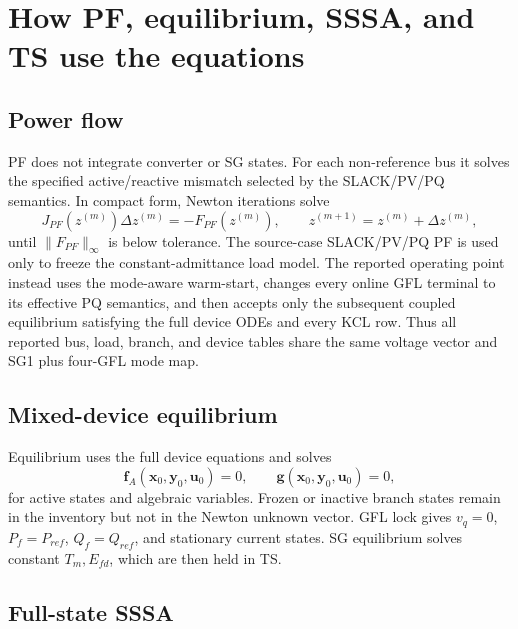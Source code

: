 \documentclass[12pt,a4paper]{article}
\newcommand{\vect}[1]{\boldsymbol{#1}}
\begin{document}
\section{How PF, equilibrium, SSSA, and TS use the equations}

\subsection{Power flow}

PF does not integrate converter or SG states.  For each non-reference bus it
solves the specified active/reactive mismatch selected by the SLACK/PV/PQ
semantics.  In compact form, Newton iterations solve
\[
J_{PF}(z^{(m)})\Delta z^{(m)}=-F_{PF}(z^{(m)}),\qquad
z^{(m+1)}=z^{(m)}+\Delta z^{(m)},
\]
until \(\|F_{PF}\|_\infty\) is below tolerance.  The source-case SLACK/PV/PQ PF
is used only to freeze the constant-admittance load model.  The reported
operating point instead uses the mode-aware warm-start, changes every online
GFL terminal to its effective PQ semantics, and then accepts only the
subsequent coupled equilibrium satisfying the full device ODEs and every KCL
row.  Thus all reported bus, load, branch, and device tables share the same
voltage vector and SG1 plus four-GFL mode map.

\subsection{Mixed-device equilibrium}

Equilibrium uses the full device equations and solves
\[
\vect f_A(\vect x_0,\vect y_0,\vect u_0)=0,\qquad
\vect g(\vect x_0,\vect y_0,\vect u_0)=0,
\]
for active states and algebraic variables.  Frozen or inactive branch states
remain in the inventory but not in the Newton unknown vector.  GFL lock gives
\(v_q=0\), \(P_f=P_{ref}\), \(Q_f=Q_{ref}\), and stationary current states.
SG equilibrium solves constant \(T_m,E_{fd}\), which are then held in TS.

\subsection{Full-state SSSA}
\end{document}
